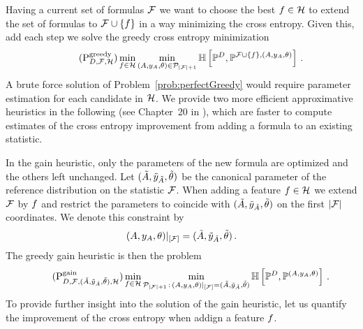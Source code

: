 Having a current set of formulas $\mathcal{F}$ we want to choose the best $f\in\mathcal{H}$ to extend the set of formulas to $\mathcal{F}\cup\{f\}$ in a way minimizing the cross entropy.
Given this, add each step we solve the greedy cross entropy minimization
\begin{align}
    \label{prob:perfectGreedy}\tag{$\probtagtypeinst{\mathrm{greedy}}{\datamap,\mlnstat,\greedyhypothesis}$}
    \min_{\formula\in\greedyhypothesis} \min_{\hybridparam\in\hybridparamsetofdim{\cardof{\mlnstat}+1}}
    \centropyof{\empdistribution}{\probof{\mlnstat\cup\{\formula\},\hybridparam}} \, .
\end{align}
A brute force solution of Problem~\eqref{prob:perfectGreedy} would require parameter estimation for each candidate in $\mathcal{H}$.
We provide two more efficient approximative heuristics in the following (see Chapter~20 in \cite{koller_probabilistic_2009}), which are faster to compute estimates of the cross entropy improvement from adding a formula to an existing statistic.


In the gain heuristic, only the parameters of the new formula are optimized and the others left unchanged.
Let $(\tilde{A},\tilde{y}_{\tilde{A}},\tilde{\theta})$ be the canonical parameter of the reference distribution on the statistic $\mathcal{F}$.
When adding a feature $f\in\mathcal{H}$ we extend $\mathcal{F}$ by $f$ and restrict the parameters to coincide with $(\tilde{A},\tilde{y}_{\tilde{A}},\tilde{\theta})$ on the first $\left|\mathcal{F}\right|$ coordinates.
We denote this constraint by
\begin{align*}
    {(A,y_{A},\theta)}|_{[\mathcal{F}]} = (\tilde{A},\tilde{y}_{\tilde{A}},\tilde{\theta}) \, .
\end{align*}
The greedy gain heuristic is then the problem
\begin{align}
    \label{prob:greedyGain}\tag{$\probtagtypeinst{\gainsymbol}{\datamap,\formulaset,\sechybridparam,\greedyhypothesis}$}
    \min_{\formula\in\greedyhypothesis} \min_{\hybridparamsetofdim{\cardof{\mlnstat}+1} \wcols \restrictionofto{\hybridparam}{[\mlnstat]} = \sechybridparam }
    \centropyof{\empdistribution}{\probof{\hybridparam}} \, .
\end{align}
To provide further insight into the solution of the gain heuristic, let us quantify the improvement of the cross entropy when addign a feature $f$.

